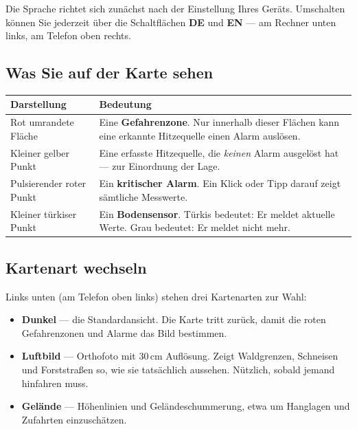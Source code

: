 \documentclass[11pt,a4paper,DIV=12,parskip=half]{scrartcl}
\begin{document}
Die Sprache richtet sich zunächst nach der Einstellung Ihres Geräts. Umschalten
können Sie jederzeit über die Schaltflächen \textbf{DE} und \textbf{EN} --- am
Rechner unten links, am Telefon oben rechts.

\subsection{Was Sie auf der Karte sehen}

\begin{center}
\begin{tabularx}{\textwidth}{@{}lX@{}}
\toprule
\textbf{Darstellung} & \textbf{Bedeutung} \\
\midrule
Rot umrandete Fläche & Eine \textbf{Gefahrenzone}. Nur innerhalb dieser
Flächen kann eine erkannte Hitzequelle einen Alarm auslösen. \\[4pt]
Kleiner gelber Punkt & Eine erfasste Hitzequelle, die \emph{keinen} Alarm
ausgelöst hat --- zur Einordnung der Lage. \\[4pt]
Pulsierender roter Punkt & Ein \textbf{kritischer Alarm}. Ein Klick oder Tipp
darauf zeigt sämtliche Messwerte. \\[4pt]
Kleiner türkiser Punkt & Ein \textbf{Bodensensor}. Türkis bedeutet: Er meldet
aktuelle Werte. Grau bedeutet: Er meldet nicht mehr. \\
\bottomrule
\end{tabularx}
\end{center}

\subsection{Kartenart wechseln}

Links unten (am Telefon oben links) stehen drei Kartenarten zur Wahl:

\begin{itemize}
  \item \textbf{Dunkel} --- die Standardansicht. Die Karte tritt zurück, damit
        die roten Gefahrenzonen und Alarme das Bild bestimmen.
  \item \textbf{Luftbild} --- Orthofoto mit 30\,cm Auflösung. Zeigt Waldgrenzen,
        Schneisen und Forststraßen so, wie sie tatsächlich aussehen. Nützlich,
        sobald jemand hinfahren muss.
  \item \textbf{Gelände} --- Höhenlinien und Geländeschummerung, etwa um
        Hanglagen und Zufahrten einzuschätzen.
\end{itemize}
\end{document}
